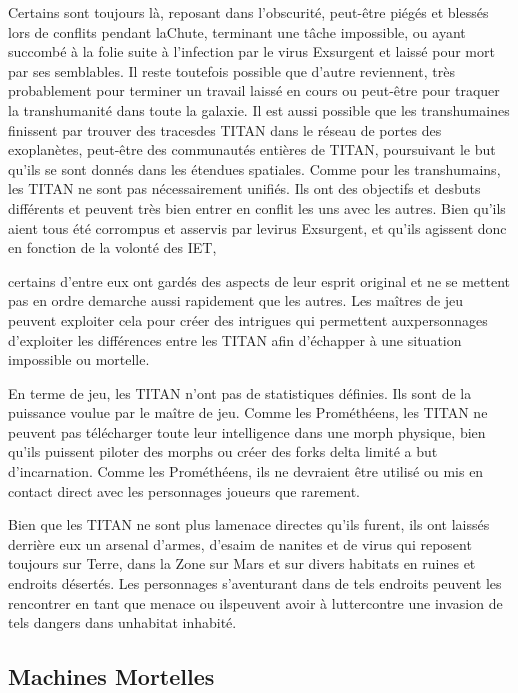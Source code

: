 Certains sont toujours là, reposant dans l'obscurité, peut-être piégés et blessés lors de conflits pendant laChute, terminant une tâche impossible, ou ayant succombé à la folie suite à l'infection par le virus Exsurgent et laissé pour mort par ses semblables. Il reste toutefois possible que d'autre reviennent, très probablement pour terminer un travail laissé en cours ou peut-être pour traquer la transhumanité dans toute la galaxie. Il est aussi possible que les transhumaines finissent par trouver des tracesdes TITAN dans le réseau de portes des exoplanètes, peut-être des communautés entières de TITAN, poursuivant le but qu'ils se sont donnés dans les étendues spatiales. Comme pour les transhumains, les TITAN ne sont pas nécessairement unifiés. Ils ont des objectifs et desbuts différents et peuvent très bien entrer en conflit les uns avec les autres. Bien qu'ils aient tous été corrompus et asservis par levirus Exsurgent, et qu'ils agissent donc en fonction de la volonté des IET, 

certains d'entre eux ont gardés des aspects de leur esprit original et ne se mettent pas en ordre demarche aussi rapidement que les autres. Les maîtres de jeu peuvent exploiter cela pour créer des intrigues qui permettent auxpersonnages d'exploiter les différences entre les TITAN afin d'échapper à une situation impossible ou mortelle. 

En terme de jeu, les TITAN n'ont pas de statistiques définies. Ils sont de la puissance voulue par le maître de jeu. Comme les Prométhéens, les TITAN ne peuvent pas télécharger toute leur intelligence dans une morph physique, bien qu'ils puissent piloter des morphs ou créer des forks delta limité a but d'incarnation. Comme les Prométhéens, ils ne devraient être utilisé ou mis en contact direct avec les personnages joueurs que rarement. 

Bien que les TITAN ne sont plus lamenace directes qu'ils furent, ils ont laissés derrière eux un arsenal d'armes, d'esaim de nanites et de virus qui reposent toujours sur Terre, dans la Zone sur Mars et sur divers habitats en ruines et endroits désertés. Les personnages s'aventurant dans de tels endroits peuvent les rencontrer en tant que menace ou ilspeuvent avoir à luttercontre une invasion de tels dangers dans unhabitat inhabité. 

\subsection{Machines Mortelles} 

